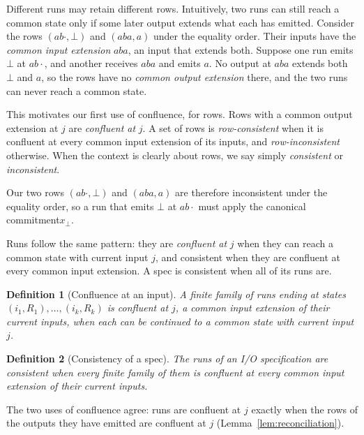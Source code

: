 \documentclass[sigconf]{cidr-2027}
\newtheorem{definition}{Definition}
\theoremstyle{remark}
\newcommand{\commitment}{commitment\xspace}
\newcommand{\inrel}{extends\xspace}          %
\newcommand{\indesc}{input extension\xspace} %
\newcommand{\outrel}{extends\xspace}          %
\newcommand{\outnoun}{output extension\xspace}%
\newcommand{\spectype}[1][]{I/O specification#1\xspace}
\begin{document}
\textcolor{reviewed}{Different runs may retain different rows.} \textcolor{reviewed}{Intuitively, two runs can still
reach a common state only if some later output extends what each has emitted.} \textcolor{reviewed}{Consider the rows $(ab\cdot,\bot)$ and $(aba,a)$ under the equality order.} \textcolor{reviewed}{Their inputs have the \emph{common \indesc} $aba$, an input that \inrel both.} \textcolor{reviewed}{Suppose one run emits $\bot$ at $ab\cdot$, and another receives $aba$ and
emits $a$.} \textcolor{reviewed}{No output at $aba$ \outrel both $\bot$ and $a$, so the rows have
no \emph{common \outnoun} there, and the two runs can never reach a common
state.}

\textcolor{reviewed}{This motivates our first use of confluence, for rows.} Rows with a common
\outnoun at $j$ are \emph{confluent at} $j$. \textcolor{reviewed}{A set of rows is
\emph{row-consistent} when it is confluent at every common \indesc of its
inputs, and \emph{row-inconsistent} otherwise.} \textcolor{reviewed}{When the context is clearly
about rows, we say simply \emph{consistent} or \emph{inconsistent}.}

\textcolor{reviewed}{Our two rows $(ab\cdot,\bot)$ and $(aba,a)$ are therefore inconsistent under the
equality order, so a run that emits $\bot$ at $ab\cdot$ must apply the canonical \commitment $x_\bot$.}

\textcolor{reviewed}{Runs follow the same pattern: they are \emph{confluent at} $j$ when they can
reach a common state with current input $j$, and consistent when they are
confluent at every common \indesc.} \textcolor{reviewed}{A spec is consistent when all of its
runs are.}

\begin{definition}[Confluence at an input]
\label{def:confluence}
\textcolor{reviewed}{A finite family of runs ending at states $(i_1,R_1),\ldots,(i_k,R_k)$ is \emph{confluent at} $j$, a common \indesc of their current inputs, when each can be continued to a common state with current input $j$.}
\end{definition}

\begin{definition}[Consistency of a spec]
\label{def:consistency}
\textcolor{reviewed}{The runs of an \spectype are \emph{consistent} when every finite family of
them is confluent at every common \indesc of their current inputs.}
\end{definition}

The two uses of confluence agree: runs are confluent at $j$ exactly when the
rows of the outputs they have emitted are confluent at $j$
(Lemma~\ref{lem:reconciliation}).
\end{document}
